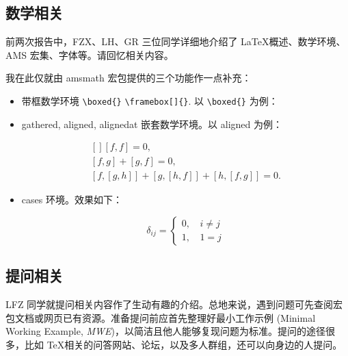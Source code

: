 \subsection{数学相关}
前两次报告中，FZX、LH、GR 三位同学详细地介绍了 \LaTeX 概述、数学环境、AMS 宏集、字体等。请回忆相关内容。

我在此仅就由 amsmath 宏包提供的三个功能作一点补充：
\begin{itemize}
\item 带框数学环境 \verb|\boxed{}| \verb|\framebox[]{}|. 以 \verb|\boxed{}| 为例：
\begin{vertlst}

\boxed{\e^{\iu \theta} = \cos{\theta} + \iu \sin{\theta}}
\end{vertlst}
\item \textsf{gathered}, \textsf{aligned}, \textsf{alignedat} 嵌套数学环境。以 aligned 为例：
\begin{vertlst}

\begin{equation}
\begin{gathered}[]
  [f, f] = 0, \\
  [f, g] + [g, f] = 0, \\
  [f, [g, h]] + [g, [h, f]] + [h, [f, g]] = 0.
\end{gathered}
\end{equation} 
\end{vertlst}
\item cases 环境。效果如下：
\begin{sidelst}
\begin{equation}
  \delta_{ij} =
  \begin{cases}
    0, \, & i \ne j \\
    1, & 1 = j
  \end{cases}
\end{equation}
\end{sidelst}
\end{itemize}

\subsection{提问相关}
LFZ 同学就提问相关内容作了生动有趣的介绍。总地来说，遇到问题可先查阅宏包文档或网页已有资源。准备提问前应首先整理好最小工作示例 (Minimal Working Example, \emph{MWE})，以简洁且他人能够复现问题为标准。提问的途径很多，比如 \TeX 相关的问答网站、论坛，以及多人群组，还可以向身边的人提问。